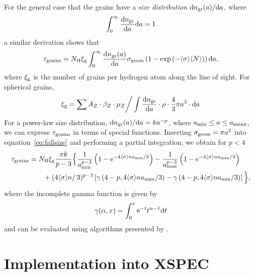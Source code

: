 \documentclass{aastex}
\newcommand{\avg}[1]{\ensuremath{\langle #1 \rangle}}
\newcommand{\Nbar}{\ensuremath{\avg{N}}}
\newcommand{\sigbar}{\ensuremath{\avg{\sigma}}}
\newcommand{\dd}{\ensuremath{{\rm d}}}
\begin{document}
For the general case that the grains have a \emph{size distribution}
$\dd n_{\rm gr}(a)/\dd a$, where
\begin{equation}
\int_0^{\infty} \frac{\dd n_{\rm gr}}{\dd a} \dd a = 1
\end{equation}
a similar derivation shows that
\begin{equation}\label{eq:fallsize}
\tau_{\rm grains}=N_{\rm H} \xi_{\rm g}  
  \int_0^\infty \frac{\dd n_{\rm gr}(a)}{\dd a}  \sigma_{\rm geom} 
  \left(1-\exp\left(-\sigbar \Nbar\right)\right)
\dd a,
\end{equation}
where $\xi_{\rm g}$ is the number of grains per hydrogen atom along
the line of sight. For spherical grains,
\begin{equation}
\xi_{\rm g}= \sum A_Z\cdot\beta_Z\cdot\mu_Z \bigg/ 
  \int \frac{\dd n_{\rm gr}}{\dd a} \cdot \rho \cdot \frac{4}{3}
  \pi a^3 \cdot  \dd a 
\end{equation}
For a power-law size distribution, $\dd n_{\rm gr}(a)/\dd a = k
a^{-p}$, where $a_{\rm min} \le a \le a_{\rm amax}$, we can
express $\tau_{\rm grains}$ in terms of special functions.
Inserting $\sigma_{\rm geom}=\pi a^2$ into
equation~\eqref{eq:fallsize} and performing a partial integration, we
obtain for $p<4$
\begin{equation}
\begin{split}
\tau_{\rm grains}  &= N_{\rm H} \xi_{\rm g} \frac{\pi k}{p-3}
\Big\{
   \frac{1}{a_{\rm min}^{p-3}}
   \left( 1-{\rm e}^{-4\sigbar n a_{\rm min}/3}\right) 
   - 
   \frac{1}{a_{\rm max}^{p-3}}
   \left( 1-{\rm e}^{-4\sigbar n a_{\rm max}/3}\right) \\
 & \qquad +
     \left(4 \sigbar n \right/3)^{p-3}
     \left[
         \gamma\left(4-p, 4 \sigbar n a_{\rm max}/3\right) -
         \gamma\left(4-p, 4 \sigbar n a_{\rm min}/3\right)
     \right]
\Big\},
\end{split}
\end{equation}
where the incomplete gamma function is given by \citep[section
6.5]{abramowitz:64a}
\begin{equation}
\gamma(\alpha,x)=\int_0^x {\rm e}^{-t} t^{\alpha-1} \dd t
\end{equation}
and can be evaluated using algorithms presented by
\citet[Section~6.2]{nr}.

\section{Implementation into XSPEC}\label{sec:xspec}
\end{document}
